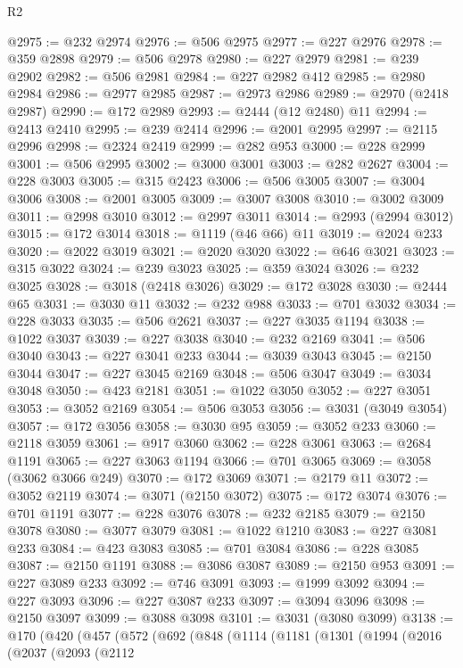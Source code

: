 \begin{lexlean}{R2}
\begin{coremodule}
@2975 := @232 @2974
@2976 := @506 @2975
@2977 := @227 @2976
@2978 := @359 @2898
@2979 := @506 @2978
@2980 := @227 @2979
@2981 := @239 @2902
@2982 := @506 @2981
@2984 := @227 @2982 @412
@2985 := @2980 @2984
@2986 := @2977 @2985
@2987 := @2973 @2986
@2989 := @2970 (@2418 @2987)
@2990 := @172 @2989
@2993 := @2444 (@12 @2480) @11
@2994 := @2413 @2410
@2995 := @239 @2414
@2996 := @2001 @2995
@2997 := @2115 @2996
@2998 := @2324 @2419
@2999 := @282 @953
@3000 := @228 @2999
@3001 := @506 @2995
@3002 := @3000 @3001
@3003 := @282 @2627
@3004 := @228 @3003
@3005 := @315 @2423
@3006 := @506 @3005
@3007 := @3004 @3006
@3008 := @2001 @3005
@3009 := @3007 @3008
@3010 := @3002 @3009
@3011 := @2998 @3010
@3012 := @2997 @3011
@3014 := @2993 (@2994 @3012)
@3015 := @172 @3014
@3018 := @1119 (@46 @66) @11
@3019 := @2024 @233
@3020 := @2022 @3019
@3021 := @2020 @3020
@3022 := @646 @3021
@3023 := @315 @3022
@3024 := @239 @3023
@3025 := @359 @3024
@3026 := @232 @3025
@3028 := @3018 (@2418 @3026)
@3029 := @172 @3028
@3030 := @2444 @65
@3031 := @3030 @11
@3032 := @232 @988
@3033 := @701 @3032
@3034 := @228 @3033
@3035 := @506 @2621
@3037 := @227 @3035 @1194
@3038 := @1022 @3037
@3039 := @227 @3038
@3040 := @232 @2169
@3041 := @506 @3040
@3043 := @227 @3041 @233
@3044 := @3039 @3043
@3045 := @2150 @3044
@3047 := @227 @3045 @2169
@3048 := @506 @3047
@3049 := @3034 @3048
@3050 := @423 @2181
@3051 := @1022 @3050
@3052 := @227 @3051
@3053 := @3052 @2169
@3054 := @506 @3053
@3056 := @3031 (@3049 @3054)
@3057 := @172 @3056
@3058 := @3030 @95
@3059 := @3052 @233
@3060 := @2118 @3059
@3061 := @917 @3060
@3062 := @228 @3061
@3063 := @2684 @1191
@3065 := @227 @3063 @1194
@3066 := @701 @3065
@3069 := @3058 (@3062 @3066 @249)
@3070 := @172 @3069
@3071 := @2179 @11
@3072 := @3052 @2119
@3074 := @3071 (@2150 @3072)
@3075 := @172 @3074
@3076 := @701 @1191
@3077 := @228 @3076
@3078 := @232 @2185
@3079 := @2150 @3078
@3080 := @3077 @3079
@3081 := @1022 @1210
@3083 := @227 @3081 @233
@3084 := @423 @3083
@3085 := @701 @3084
@3086 := @228 @3085
@3087 := @2150 @1191
@3088 := @3086 @3087
@3089 := @2150 @953
@3091 := @227 @3089 @233
@3092 := @746 @3091
@3093 := @1999 @3092
@3094 := @227 @3093
@3096 := @227 @3087 @233
@3097 := @3094 @3096
@3098 := @2150 @3097
@3099 := @3088 @3098
@3101 := @3031 (@3080 @3099)
@3138 := @170
    (@420
      (@457
        (@572
          (@692
            (@848
              (@1114
                (@1181
                  (@1301
                    (@1994
                      (@2016
                        (@2037
                          (@2093
                            (@2112

\end{coremodule}
\end{lexlean}
